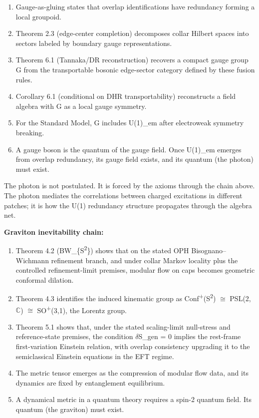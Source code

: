 \begin{enumerate}
\def\labelenumi{\arabic{enumi}.}
\tightlist
\item
  Gauge-as-gluing states that overlap identifications have redundancy forming a local groupoid.
\item
  Theorem 2.3 (edge-center completion) decomposes collar Hilbert spaces into sectors labeled by boundary gauge representations.
\item
  Theorem 6.1 (Tannaka/DR reconstruction) recovers a compact gauge group G from the transportable bosonic edge-sector category defined by these fusion rules.
\item
  Corollary 6.1 (conditional on DHR transportability) reconstructs a field algebra with G as a local gauge symmetry.
\item
  For the Standard Model, G includes U(1)\_em after electroweak symmetry breaking.
\item
  A gauge boson is the quantum of the gauge field. Once U(1)\_em emerges from overlap redundancy, its gauge field exists, and its quantum (the photon) must exist.
\end{enumerate}

The photon is not postulated. It is forced by the axioms through the chain above. The photon mediates the correlations between charged excitations in different patches; it is how the U(1) redundancy structure propagates through the algebra net.

\textbf{Graviton inevitability chain:}

\begin{enumerate}
\def\labelenumi{\arabic{enumi}.}
\tightlist
\item
  Theorem 4.2 (BW\_\{S\textsuperscript{2}\}) shows that on the stated OPH Bisognano--Wichmann refinement branch, and under collar Markov locality plus the controlled refinement-limit premises, modular flow on caps becomes geometric conformal dilation.
\item
  Theorem 4.3 identifies the induced kinematic group as Conf\textsuperscript{+}(S\textsuperscript{2}) \ensuremath{\cong} PSL(2,\ensuremath{\mathbb{C}}) \ensuremath{\cong} SO\textsuperscript{+}(3,1), the Lorentz group.
\item
  Theorem 5.1 shows that, under the stated scaling-limit null-stress and reference-state premises, the condition \ensuremath{\delta}S\_gen = 0 implies the rest-frame first-variation Einstein relation, with overlap consistency upgrading it to the semiclassical Einstein equations in the EFT regime.
\item
  The metric tensor emerges as the compression of modular flow data, and its dynamics are fixed by entanglement equilibrium.
\item
  A dynamical metric in a quantum theory requires a spin-2 quantum field. Its quantum (the graviton) must exist.
\end{enumerate}


